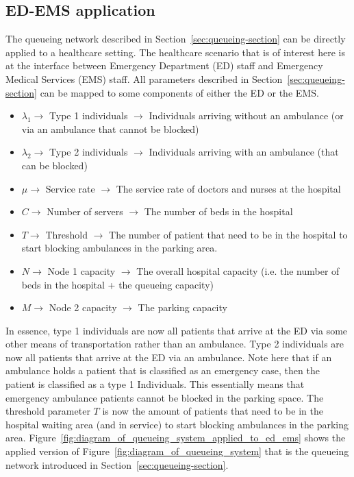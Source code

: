 \subsection{ED-EMS application}

The queueing network described in Section~\ref{sec:queueing-section} can be
directly applied to a healthcare setting.
The healthcare scenario that is of interest here is at the interface between
Emergency Department (ED) staff and Emergency Medical Services (EMS) staff.
All parameters described in Section~\ref{sec:queueing-section} can be mapped
to some components of either the ED or the EMS.

\begin{itemize}
    \item \(\lambda_1 \rightarrow\) Type 1 individuals \(\rightarrow\)
    Individuals arriving without an ambulance (or via an ambulance that cannot
    be blocked)
    \item \(\lambda_2 \rightarrow\) Type 2 individuals \(\rightarrow\)
    Individuals arriving with an ambulance (that can be blocked)
    \item \(\mu \rightarrow\) Service rate \(\rightarrow\) The service rate of
    doctors and nurses at the hospital
    \item \(C \rightarrow\) Number of servers \(\rightarrow\) The number of
    beds in the hospital
    \item \(T \rightarrow\) Threshold \(\rightarrow\) The number of patient that
    need to be in the hospital to start blocking ambulances in the parking area.
    \item \(N \rightarrow\) Node 1 capacity \(\rightarrow\) The overall hospital
    capacity (i.e. the number of beds in the hospital + the queueing capacity)
    \item \(M \rightarrow\) Node 2 capacity \(\rightarrow\) The parking capacity
\end{itemize}

In essence, type 1 individuals are now all patients that arrive at the ED via
some other means of transportation rather than an ambulance.
Type 2 individuals are now all patients that arrive at the ED via an ambulance.
Note here that if an ambulance holds a patient that is classified as an
emergency case, then the patient is classified as a type 1 Individuals.
This essentially means that emergency ambulance patients cannot be blocked in
the parking space.
The threshold parameter \(T\) is now the amount of patients that need to be in
the hospital waiting area (and in service) to start blocking ambulances in the
parking area.
Figure~\ref{fig:diagram_of_queueing_system_applied_to_ed_ems} shows the applied
version of Figure~\ref{fig:diagram_of_queueing_system} that is the queueing
network introduced in Section~\ref{sec:queueing-section}.

